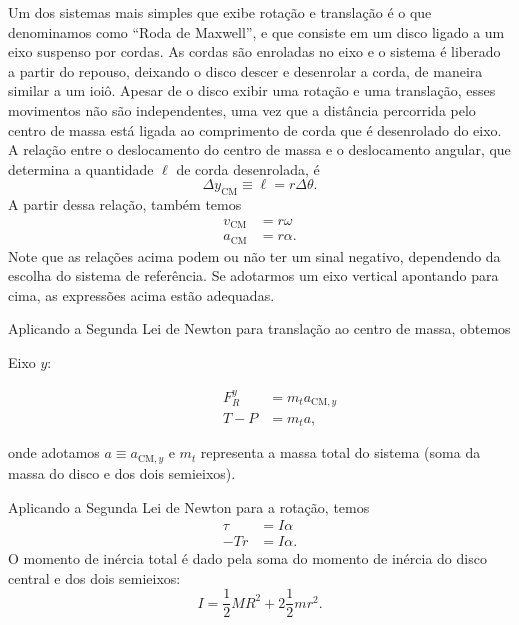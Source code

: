 Um dos sistemas mais simples que exibe rotação e translação é o que denominamos como ``Roda de Maxwell'', e que consiste em um disco ligado a um eixo suspenso por cordas. As cordas são enroladas no eixo e o sistema é liberado a partir do repouso, deixando o disco descer e desenrolar a corda, de maneira similar a um ioiô. Apesar de o disco exibir uma rotação e uma translação, esses movimentos não são independentes, uma vez que a distância percorrida pelo centro de massa está ligada ao comprimento de corda que é desenrolado do eixo. A relação entre o deslocamento do centro de massa e o deslocamento angular, que determina a quantidade $\ell$ de corda desenrolada, é
\begin{equation}
    \Delta y_{\text{CM}} \equiv \ell = r \Delta \theta.
\end{equation}
%
A partir dessa relação, também temos
\begin{align}
    v_{\text{CM}} &= r \omega \\
    a_{\text{CM}} &= r \alpha.
\end{align}
%
Note que as relações acima podem ou não ter um sinal negativo, dependendo da escolha do sistema de referência. Se adotarmos um eixo vertical apontando para cima, as expressões acima estão adequadas. %

Aplicando a Segunda Lei de Newton para translação ao centro de massa, obtemos
\begin{description}
\item[Eixo $y$:]
\begin{align}
    F_R^y &= m_t a_{\text{CM}, y} \\
    T - P &= m_t a,
\end{align}
\end{description}
%
onde adotamos $a \equiv a_{\text{CM}, y}$ e $m_t$ representa a massa total do sistema (soma da massa do disco e dos dois semieixos).

Aplicando a Segunda Lei de Newton para a rotação, temos
\begin{align}
    \tau &= I\alpha \\
    -Tr &= I\alpha.
\end{align}
%
O momento de inércia total é dado pela soma do momento de inércia do disco central e dos dois semieixos:
\begin{equation}
    I = \frac{1}{2} MR^2 + 2\frac{1}{2} m r^2.
\end{equation}

